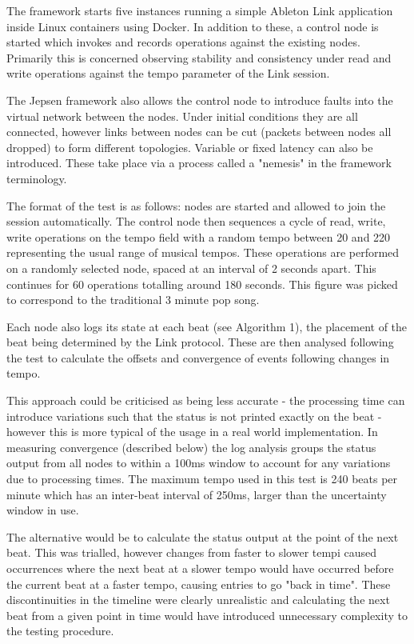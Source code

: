 \documentclass[11pt]{article} %
\theoremstyle{plain}
\theoremstyle{definition}
\begin{document}
The framework starts five instances running a simple Ableton Link application
inside Linux containers using Docker. In addition to these, a control node is
started which invokes and records operations against the existing nodes.
Primarily this is concerned observing stability and consistency under read and
write operations against the tempo parameter of the Link session.

The Jepsen framework also allows the control node to introduce faults into the
virtual network between the nodes. Under initial conditions they are all
connected, however links between nodes can be cut (packets between nodes all
dropped) to form different topologies. Variable or fixed latency can also be
introduced. These take place via a process called a "nemesis" in the framework
terminology.

The format of the test is as follows: nodes are started and allowed to join the
session automatically. The control node then sequences a cycle of read, write,
write operations on the tempo field with a random tempo between 20 and 220
representing the usual range of musical tempos. These operations are performed
on a randomly selected node, spaced at an interval of 2 seconds apart. This
continues for 60 operations totalling around 180 seconds. This figure was
picked to correspond to the traditional 3 minute pop song.

Each node also logs its state at each beat (see Algorithm 1), the placement of
the beat being determined by the Link protocol. These are then analysed
following the test to calculate the offsets and convergence of events following
changes in tempo.

This approach could be criticised as being less accurate - the processing time
can introduce variations such that the status is not printed exactly on the
beat - however this is more typical of the usage in a real world
implementation. In measuring convergence (described below) the log analysis
groups the status output from all nodes to within a 100ms window to account for
any variations due to processing times. The maximum tempo used in this test is
240 beats per minute which has an inter-beat interval of 250ms, larger than the
uncertainty window in use.

The alternative would be to calculate the status output at the point of the
next beat. This was trialled, however changes from faster to slower tempi
caused occurrences where the next beat at a slower tempo would have occurred
before the current beat at a faster tempo, causing entries to go "back in
time". These discontinuities in the timeline were clearly unrealistic and
calculating the next beat from a given point in time would have introduced
unnecessary complexity to the testing procedure.
\end{document}
